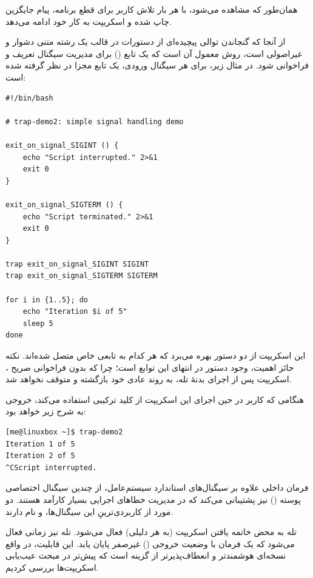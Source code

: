همان‌طور که مشاهده می‌شود، با هر بار تلاش کاربر برای قطع برنامه، پیام جایگزین چاپ شده و اسکریپت به کار خود ادامه می‌دهد.

از آنجا که گنجاندن توالی پیچیده‌ای از دستورات در قالب یک رشته متنی دشوار و غیراصولی است، روش معمول آن است که یک تابع () برای مدیریت سیگنال تعریف و فراخوانی شود. در مثال زیر، برای هر سیگنال ورودی، یک تابع مجزا در نظر گرفته شده است:

\begin{latin}
\begin{lstlisting}
#!/bin/bash

# trap-demo2: simple signal handling demo

exit_on_signal_SIGINT () {
    echo "Script interrupted." 2>&1
    exit 0
}

exit_on_signal_SIGTERM () {
    echo "Script terminated." 2>&1
    exit 0
}

trap exit_on_signal_SIGINT SIGINT
trap exit_on_signal_SIGTERM SIGTERM

for i in {1..5}; do
    echo "Iteration $i of 5"
    sleep 5
done
\end{lstlisting}
\end{latin}

این اسکریپت از دو دستور  بهره می‌برد که هر کدام به تابعی خاص متصل شده‌اند. نکته حائز اهمیت، وجود دستور  در انتهای این توابع است؛ چرا که بدون فراخوانی صریح ، اسکریپت پس از اجرای بدنهٔ تله، به روند عادی خود بازگشته و متوقف نخواهد شد.

هنگامی که کاربر در حین اجرای این اسکریپت از کلید ترکیبی  استفاده می‌کند، خروجی به شرح زیر خواهد بود:

\begin{latin}
\begin{lstlisting}
[me@linuxbox ~]$ trap-demo2
Iteration 1 of 5
Iteration 2 of 5
^CScript interrupted.
\end{lstlisting}
\end{latin}

فرمان داخلی  علاوه بر سیگنال‌های استاندارد سیستم‌عامل، از چندین سیگنال اختصاصی پوسته () نیز پشتیبانی می‌کند که در مدیریت خطاهای اجرایی بسیار کارآمد هستند. دو مورد از کاربردی‌ترینِ این سیگنال‌ها،  و  نام دارند.

تله  به محض خاتمه یافتن اسکریپت (به هر دلیلی) فعال می‌شود. تله  نیز زمانی فعال می‌شود که یک فرمان با وضعیت خروجی () غیرصفر پایان یابد. این قابلیت، در واقع نسخه‌ای هوشمندتر و انعطاف‌پذیرتر از گزینه  است که پیش‌تر در مبحث عیب‌یابی اسکریپت‌ها بررسی کردیم.

